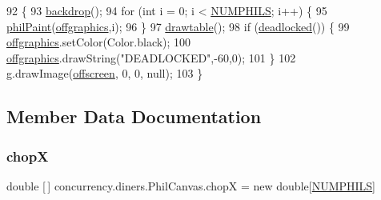 \begin{DoxyCode}
92                                    \{
93         \mbox{\hyperlink{classconcurrency_1_1diners_1_1_phil_canvas_af3662f3ac17bd8dcb12f9c71d1a8b9f1}{backdrop}}();
94         \textcolor{keywordflow}{for} (\textcolor{keywordtype}{int} i = 0; i < \mbox{\hyperlink{classconcurrency_1_1diners_1_1_phil_canvas_a3eeb58e8b150bc1715a708ef38171fd5}{NUMPHILS}}; i++) \{
95           \mbox{\hyperlink{classconcurrency_1_1diners_1_1_phil_canvas_a7355845d8b7bc65a0d12d154003bd8b4}{philPaint}}(\mbox{\hyperlink{classconcurrency_1_1diners_1_1_phil_canvas_a8ef774c408aeaad890a9cdb7d5bc6a5a}{offgraphics}},i);
96         \}
97         \mbox{\hyperlink{classconcurrency_1_1diners_1_1_phil_canvas_a7d4dc4fa1339e653bdaabb4123522517}{drawtable}}();
98         \textcolor{keywordflow}{if} (\mbox{\hyperlink{classconcurrency_1_1diners_1_1_phil_canvas_a4792fa3037ac30fdc1645047637b861a}{deadlocked}}()) \{
99             \mbox{\hyperlink{classconcurrency_1_1diners_1_1_phil_canvas_a8ef774c408aeaad890a9cdb7d5bc6a5a}{offgraphics}}.setColor(Color.black);
100             \mbox{\hyperlink{classconcurrency_1_1diners_1_1_phil_canvas_a8ef774c408aeaad890a9cdb7d5bc6a5a}{offgraphics}}.drawString(\textcolor{stringliteral}{"DEADLOCKED"},-60,0);
101         \}
102         g.drawImage(\mbox{\hyperlink{classconcurrency_1_1diners_1_1_phil_canvas_acad40c9dc3eba609d61f21b19292fb59}{offscreen}}, 0, 0, null);
103     \}
\end{DoxyCode}


\subsection{Member Data Documentation}
\mbox{\label{classconcurrency_1_1diners_1_1_phil_canvas_a242029d46b5931d89cd7bf3894905d16}} 
\subsubsection{\texorpdfstring{chopX}{chopX}}
{\footnotesize\ttfamily double \mbox{[}$\,$\mbox{]} concurrency.\+diners.\+Phil\+Canvas.\+chopX = new double\mbox{[}\mbox{\hyperlink{classconcurrency_1_1diners_1_1_phil_canvas_a3eeb58e8b150bc1715a708ef38171fd5}{N\+U\+M\+P\+H\+I\+LS}}\mbox{]}\hspace{0.3cm}{\ttfamily [package]}}

